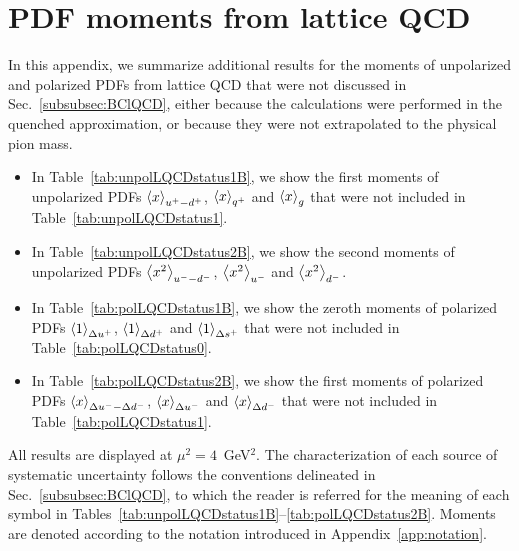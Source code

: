\section{PDF moments from lattice QCD}
\label{sec:LQCDtables}

In this appendix, we summarize additional results for the moments of 
unpolarized and polarized PDFs from lattice QCD that were not discussed in 
Sec.~\ref{subsubsec:BClQCD}, either because the calculations were 
performed in the quenched approximation, or because they were not extrapolated
to the physical pion mass.

\begin{itemize}

\item In Table~\ref{tab:unpolLQCDstatus1B}, we show the first moments of 
unpolarized PDFs $\left\langle x\right\rangle_{u^+-d^+}$, $\left\langle x\right\rangle_{q^+}$ and $\left\langle x\right\rangle_g$
that were not included in Table~\ref{tab:unpolLQCDstatus1}.

\item In Table~\ref{tab:unpolLQCDstatus2B}, we show the second moments of 
unpolarized PDFs $\left\langle x^2\right\rangle_{u^--d^-}$, $\left\langle x^2\right\rangle_{u^-}$ and $\left\langle x^2\right\rangle_{d^-}$.

\item In Table~\ref{tab:polLQCDstatus1B}, we show the zeroth moments of 
polarized PDFs $\left\langle 1\right\rangle_{\Delta u^+}$, $\left\langle 1\right\rangle_{\Delta d^+}$ and 
$\left\langle 1\right\rangle_{\Delta s^+}$ that were not included in Table~\ref{tab:polLQCDstatus0}.

\item In Table~\ref{tab:polLQCDstatus2B}, we show the first moments of 
polarized PDFs $\left\langle x\right\rangle_{\Delta u^--\Delta d^-}$, $\left\langle x\right\rangle_{\Delta u^-}$ and  
$\left\langle x\right\rangle_{\Delta d^-}$ that were not included in Table~\ref{tab:polLQCDstatus1}.

\end{itemize}
%
All results are displayed at $\mu^2=4$~GeV$^2$.
%
The characterization of each source of systematic uncertainty follows the
conventions delineated in Sec.~\ref{subsubsec:BClQCD}, to which the reader 
is referred for the meaning of each symbol in 
Tables~\ref{tab:unpolLQCDstatus1B}--\ref{tab:polLQCDstatus2B}.
%
Moments are denoted according to the notation introduced in 
Appendix~\ref{app:notation}.

